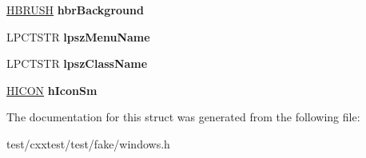 \begin{DoxyCompactItemize}
\item 
\hypertarget{structWNDCLASSEX_ad38b06907a281f2f11bd315033216bda}{\hyperlink{struct__HBRUSH}{H\-B\-R\-U\-S\-H} {\bfseries hbr\-Background}}\label{structWNDCLASSEX_ad38b06907a281f2f11bd315033216bda}

\item 
\hypertarget{structWNDCLASSEX_add0bd3802e7103db5f6d52502a8172d4}{L\-P\-C\-T\-S\-T\-R {\bfseries lpsz\-Menu\-Name}}\label{structWNDCLASSEX_add0bd3802e7103db5f6d52502a8172d4}

\item 
\hypertarget{structWNDCLASSEX_a7dabe8aa2687e391e6090b18d979320b}{L\-P\-C\-T\-S\-T\-R {\bfseries lpsz\-Class\-Name}}\label{structWNDCLASSEX_a7dabe8aa2687e391e6090b18d979320b}

\item 
\hypertarget{structWNDCLASSEX_a793b046884d6272e42e0eda1117c2704}{\hyperlink{struct__HICON}{H\-I\-C\-O\-N} {\bfseries h\-Icon\-Sm}}\label{structWNDCLASSEX_a793b046884d6272e42e0eda1117c2704}

\end{DoxyCompactItemize}


The documentation for this struct was generated from the following file\-:\begin{DoxyCompactItemize}
\item 
test/cxxtest/test/fake/windows.\-h\end{DoxyCompactItemize}
